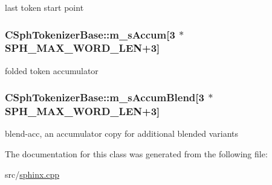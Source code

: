 last token start point 

\hypertarget{classCSphTokenizerBase_a6a2d5d4ea7af5c0f4b70c10b24fe4f7a}{
\subsubsection[{m\-\_\-s\-Accum}]{ C\-Sph\-Tokenizer\-Base\-::m\-\_\-s\-Accum\mbox{[}3 $\ast${\bf S\-P\-H\-\_\-\-M\-A\-X\-\_\-\-W\-O\-R\-D\-\_\-\-L\-E\-N}+3\mbox{]}\hspace{0.3cm}{\ttfamily [protected]}}}\label{classCSphTokenizerBase_a6a2d5d4ea7af5c0f4b70c10b24fe4f7a}


folded token accumulator 

\hypertarget{classCSphTokenizerBase_abde0beb6b6b92275aa23bf65813b5c18}{
\subsubsection[{m\-\_\-s\-Accum\-Blend}]{ C\-Sph\-Tokenizer\-Base\-::m\-\_\-s\-Accum\-Blend\mbox{[}3 $\ast${\bf S\-P\-H\-\_\-\-M\-A\-X\-\_\-\-W\-O\-R\-D\-\_\-\-L\-E\-N}+3\mbox{]}\hspace{0.3cm}{\ttfamily [protected]}}}\label{classCSphTokenizerBase_abde0beb6b6b92275aa23bf65813b5c18}


blend-\/acc, an accumulator copy for additional blended variants 



The documentation for this class was generated from the following file\-:\begin{DoxyCompactItemize}
\item 
src/\hyperlink{sphinx_8cpp}{sphinx.\-cpp}\end{DoxyCompactItemize}
